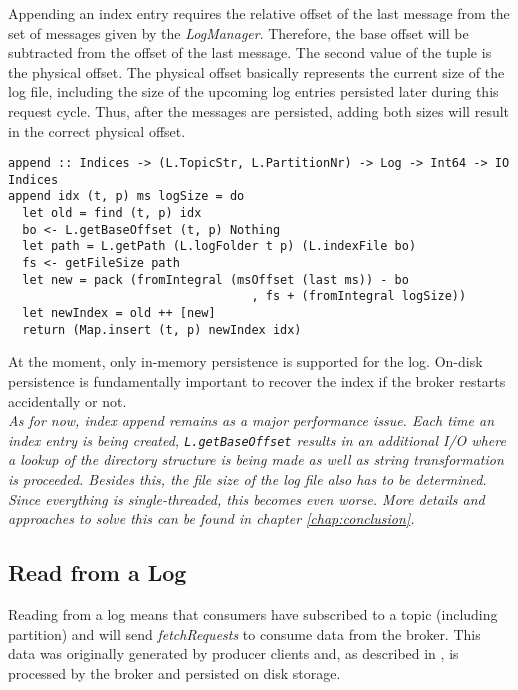 Appending an index entry requires the relative offset of the last message from
the set of messages given by the \textit{LogManager}. Therefore, the base offset will be
subtracted from the offset of the last message. The second value of the tuple is
the physical offset. The physical offset basically represents the current size
of the log file, including the size of the upcoming log entries persisted later
during this request cycle. Thus, after the messages are persisted, adding both
sizes will result in the correct physical offset.

\begin{lstlisting}[caption={Appending new entry to index}]
append :: Indices -> (L.TopicStr, L.PartitionNr) -> Log -> Int64 -> IO Indices
append idx (t, p) ms logSize = do
  let old = find (t, p) idx
  bo <- L.getBaseOffset (t, p) Nothing 
  let path = L.getPath (L.logFolder t p) (L.indexFile bo)
  fs <- getFileSize path
  let new = pack (fromIntegral (msOffset (last ms)) - bo
                                  , fs + (fromIntegral logSize)) 
  let newIndex = old ++ [new]
  return (Map.insert (t, p) newIndex idx)
\end{lstlisting}

At the moment, only in-memory persistence is supported for the log. On-disk
persistence is fundamentally important to recover the index if the broker
restarts accidentally or not. \\

\textit{As for now, index append remains as a major performance issue. Each time
  an index entry is being created, \lstinline{L.getBaseOffset} results in an
  additional I/O where a lookup of the directory structure is being made as well
  as string transformation is proceeded. Besides this, the file size of the log
file also has to be determined. Since everything is single-threaded, this
becomes even worse. More details and approaches to solve this can be found in
chapter \ref{chap:conclusion}.}

\subsection{Read from a Log}
\label{subsec:broker-log-read}

Reading from a log means that consumers have subscribed to a topic (including
partition) and will send \textit{fetchRequests} to consume data from the broker.
This data was originally generated by producer clients and, as described in
\label{subsec:broker-log-append}, is processed by the broker and persisted on
disk storage.


